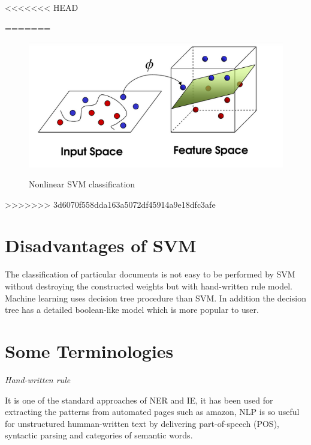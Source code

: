 <<<<<<< HEAD


=======
\begin{figure}[hbtp]
\caption{Nonlinear SVM classification}
\centering
\includegraphics[scale=.7]{images/SVMNL.png}\label{SVMNL}
\end{figure}
 
>>>>>>> 3d6070f558dda163a5072df45914a9e18dfc3afe
\section{Disadvantages of SVM} 
The classification of particular documents is not easy to be performed by SVM without destroying the constructed weights  but with hand-written rule model. Machine learning uses decision tree procedure than SVM. In addition the decision tree has a detailed boolean-like  model which is more popular to user.

\newpage

\section{Some Terminologies}

\textit{Hand-written rule}

It is one of the standard approaches of NER and IE, it has been used for extracting the patterns from automated pages such as amazon, NLP is so useful for unstructured humman-written text by delivering  part-of-speech (POS), syntactic parsing and categories of semantic words.

